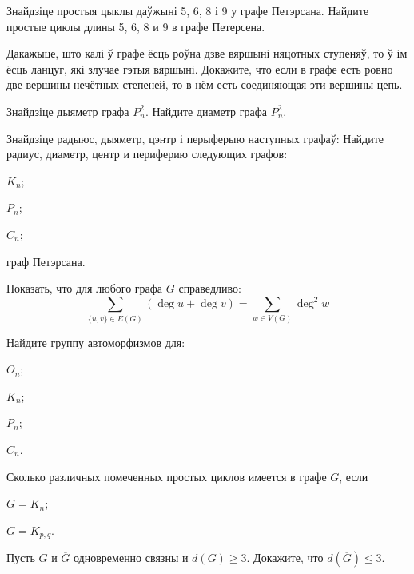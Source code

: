 \documentclass[12pt, a4paper]{article}
\begin{document}
\begin{problemList}
\bigskip

\problemItemSimple
{Знайдзіце простыя цыклы даўжыні 5, 6, 8 і 9 у графе Петэрсана.}
{Найдите простые циклы длины 5, 6, 8 и 9 в графе Петерсена.}

\bigskip

\problemItemSimple
{Дакажыце, што калі ў графе ёсць роўна дзве вяршыні няцотных ступеняў,
то ў ім ёсць ланцуг, які злучае гэтыя вяршыні.}
{Докажите, что если в графе есть ровно две вершины нечётных степеней,
то в нём есть соединяющая эти вершины цепь.}

\bigskip

\problemItemSimple
{Знайдзіце дыяметр графа $P^2_n$.}
{Найдите диаметр графа $P^2_n$.}

\bigskip

\problemItemWithCommonPart
{Знайдзіце радыюс, дыяметр, цэнтр і перыферыю наступных графаў:}
{Найдите радиус, диаметр, центр и периферию следующих графов:}
{%
\begin{belarusianEnumerateTwocol}
    \item $K_n$;
    \item $P_n$;
    \item $C_n$;
    \item граф Петэрсана.
\end{belarusianEnumerateTwocol}
}

\smallskip

{Показать, что для любого графа $G$ справедливо:}
{\[ \sum\limits_{\{u, v\}\in E(G)} (\deg u + \deg v) = \sum\limits_{w\in V(G)} \deg^2 w \]}

\medskip

{Найдите группу автоморфизмов для:}
{%
\begin{belarusianEnumerate}
    \item $O_n$;
    \item $K_n$;
    \item $P_n$;
    \item $C_n$.
\end{belarusianEnumerate}
}

\smallskip

{Сколько различных помеченных простых циклов имеется в графе $G$, если}
{%
\begin{belarusianEnumerate}
    \item $G=K_n$;
    \item $G=K_{p, q}$.
\end{belarusianEnumerate}
}

\smallskip

{Пусть $G$ и $\overline{G}$ одновременно связны и $d(G) \ge 3$.
Докажите, что $d(\overline{G}) \le 3$.}

\end{problemList}
\end{document}
